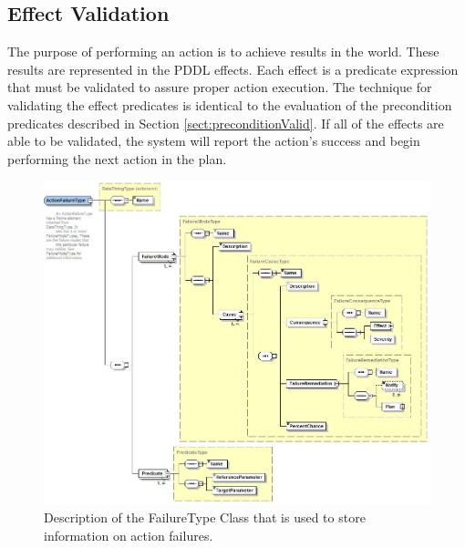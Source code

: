 \subsection{Effect Validation}
The purpose of performing an action is to achieve results in the world. These results are represented in the PDDL effects. Each effect is a predicate expression that must be validated to assure proper
action execution. The technique for validating the effect predicates is identical
to the evaluation of the precondition predicates described in Section \ref{sect:preconditionValid}. If all of the effects are able to be validated, the
system will report the action's success and begin performing the next action in the plan.
%
\begin{figure}[htb!]
\begin{center}
\includegraphics[width=12cm]{images/FailureType.jpg}
\caption{Description of the FailureType Class that is used to store information on action failures.}
\label{fig:failure}
\end{center}
\end{figure}
%